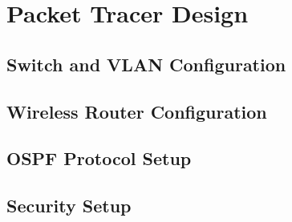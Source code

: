 \section{Packet Tracer Design}
\subsection{Switch and VLAN Configuration}

\subsection{Wireless Router Configuration}

\subsection{OSPF Protocol Setup}

\subsection{Security Setup}
